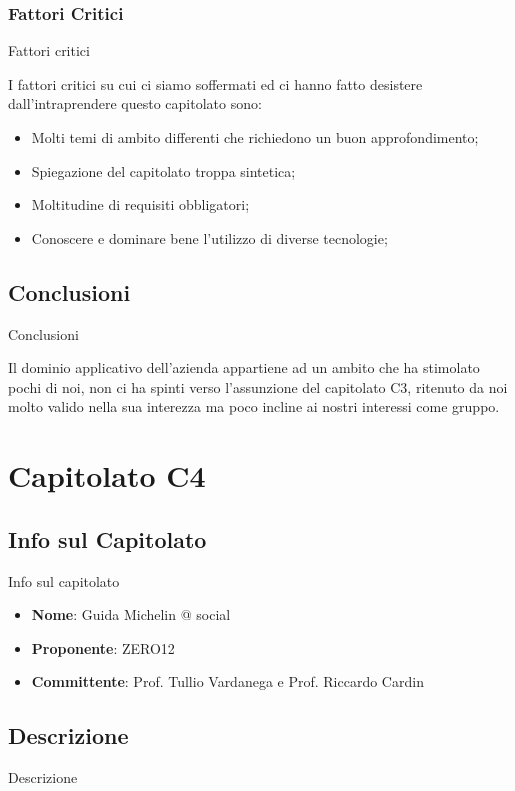 \documentclass[11pt]{article}
\begin{document}
    \subsubsection{Fattori Critici} Fattori critici
    
    I fattori critici su cui ci siamo soffermati ed ci hanno fatto desistere dall'intraprendere questo capitolato sono:
    \begin{itemize}
            \item Molti temi di ambito differenti che richiedono un buon approfondimento;
            \item Spiegazione del capitolato troppa sintetica; 
            \item Moltitudine di requisiti obbligatori;
            \item Conoscere e dominare bene l'utilizzo di diverse tecnologie;
        \end{itemize}
    \subsection{Conclusioni} Conclusioni
    
    Il dominio applicativo dell'azienda appartiene ad un ambito che ha stimolato pochi di noi, non ci ha spinti verso l'assunzione del capitolato C3, ritenuto da noi molto valido nella sua interezza ma poco incline ai nostri interessi come gruppo.    
    
\newpage
    
\section{Capitolato C4}
    \subsection{Info sul Capitolato} Info sul capitolato
    \begin{itemize}
        \item \textbf{Nome}: Guida Michelin @ social
        \item \textbf{Proponente}: ZERO12
        \item \textbf{Committente}: Prof. Tullio Vardanega e Prof. Riccardo Cardin
    \end{itemize}
    \subsection{Descrizione} Descrizione
    
\end{document}

